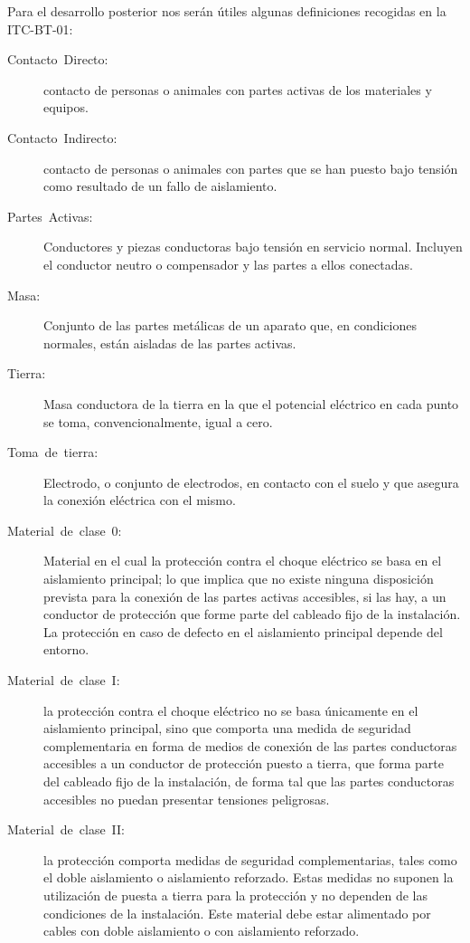 Para el desarrollo posterior nos serán útiles algunas definiciones
recogidas en la ITC-BT-01:
\begin{description}
\item [{Contacto~Directo:}] contacto de personas o animales con partes
  activas de los materiales y equipos.
\item [{Contacto~Indirecto:}] contacto de personas o animales con
  partes que se han puesto bajo tensión como resultado de un fallo de
  aislamiento.
\item [{Partes~Activas:}] Conductores y piezas conductoras bajo
  tensión en servicio normal. Incluyen el conductor neutro o
  compensador y las partes a ellos conectadas.
\item [{Masa:}] Conjunto de las partes metálicas de un aparato que, en
  condiciones normales, están aisladas de las partes activas.
\item [{Tierra:}] Masa conductora de la tierra en la que el potencial
  eléctrico en cada punto se toma, convencionalmente, igual a cero.
\item [{Toma~de~tierra:}] Electrodo, o conjunto de electrodos, en
  contacto con el suelo y que asegura la conexión eléctrica con el
  mismo.
\item [{Material~de~clase~0:}] Material en el cual la protección
  contra el choque eléctrico se basa en el aislamiento principal; lo
  que implica que no existe ninguna disposición prevista para la
  conexión de las partes activas accesibles, si las hay, a un
  conductor de protección que forme parte del cableado fijo de la
  instalación. La protección en caso de defecto en el aislamiento
  principal depende del entorno.
\item [{Material~de~clase~I:}] la protección contra el choque
  eléctrico no se basa únicamente en el aislamiento principal, sino
  que comporta una medida de seguridad complementaria en forma de
  medios de conexión de las partes conductoras accesibles a un
  conductor de protección puesto a tierra, que forma parte del
  cableado fijo de la instalación, de forma tal que las partes
  conductoras accesibles no puedan presentar tensiones peligrosas.
\item [{Material~de~clase~II:}] la protección comporta medidas de
  seguridad complementarias, tales como el doble aislamiento o
  aislamiento reforzado.  Estas medidas no suponen la utilización de
  puesta a tierra para la protección y no dependen de las condiciones
  de la instalación. Este material debe estar alimentado por cables
  con doble aislamiento o con aislamiento reforzado.

\end{description}
